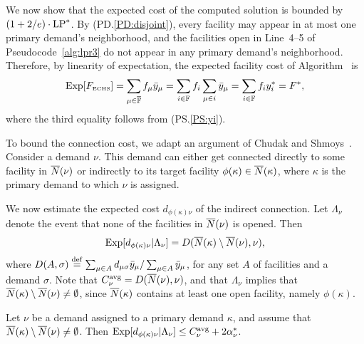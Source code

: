 
\smallskip
We now show that the expected cost of the computed solution is bounded by
$(1+2/e) \cdot \mbox{\rm LP}^\ast$. By
(PD.\ref{PD:disjoint}), every facility may appear in at
most one primary demand's neighborhood, and the facilities
open in Line~4--5 of Pseudocode~\ref{alg:lpr3} do not appear
in any primary demand's neighborhood. Therefore, by
linearity of expectation, the expected facility cost of
Algorithm~{\ECHS} is 
%
\begin{equation*}
\mbox{\rm Exp}[F_{\mbox{\tiny\rm ECHS}}] 
	= \sum_{\mu\in\overline{\mathbb{F}}} f_\mu {\bar y}_{\mu} 
	= \sum_{i\in\mathbb{F}} f_i\sum_{\mu\in i} {\bar y}_{\mu} 
	= \sum_{i\in\mathbb{F}} f_i y_i^\ast = F^\ast,
\end{equation*}
%
where the third equality follows from (PS.\ref{PS:yi}).

\smallskip

To bound the connection cost, we adapt an argument of Chudak
and Shmoys~\cite{ChudakS04}. Consider a demand $\nu$. This
demand can either get connected directly to some facility in
${\overline{N}}(\nu)$ or indirectly to its target facility $\phi(\kappa)\in
{\overline{N}}(\kappa)$, where $\kappa$ is the primary demand to
which $\nu$ is assigned.

We now estimate the expected cost $d_{\phi(\kappa)\nu}$ of the indirect
connection. Let $\Lambda_\nu$ denote the event that none of the
facilities in ${\overline{N}}(\nu)$ is opened. Then
%
\begin{equation*}
	\mbox{\rm Exp}[ d_{\phi(\kappa)\nu} | \Lambda_\nu] 
			= D({\overline{N}}(\kappa) \setminus {\overline{N}}(\nu), \nu),
\end{equation*}
%
where $D(A,\sigma) \stackrel{\mathrm{def}}{=}\sum_{\mu\in A}
d_{\mu\sigma}{\bar y}_{\mu}/\sum_{\mu\in A} {\bar y}_{\mu}$, for
any set $A$ of facilities and a demand $\sigma$.
Note that $C^{{\mbox{\scriptsize\rm avg}}}_\nu = D({\overline{N}}(\nu),\nu)$,
and that $\Lambda_\nu$ implies that ${\overline{N}}(\kappa) \setminus {\overline{N}}(\nu)\neq\emptyset$,
since ${\overline{N}}(\kappa)$ contains at least one open facility, namely $\phi(\kappa)$.


\begin{lemma}
  \label{lem:echu indirect}
  Let $\nu$ be a demand assigned to a primary demand $\kappa$, and
assume that ${\overline{N}}(\kappa) \setminus {\overline{N}}(\nu)\neq\emptyset$.
Then $\mbox{\rm Exp}[ d_{\phi(\kappa)\nu} | \Lambda_\nu]  \leq
  		C^{{\mbox{\scriptsize\rm avg}}}_\nu+2\alpha_{\nu}^\ast$.
\end{lemma}

